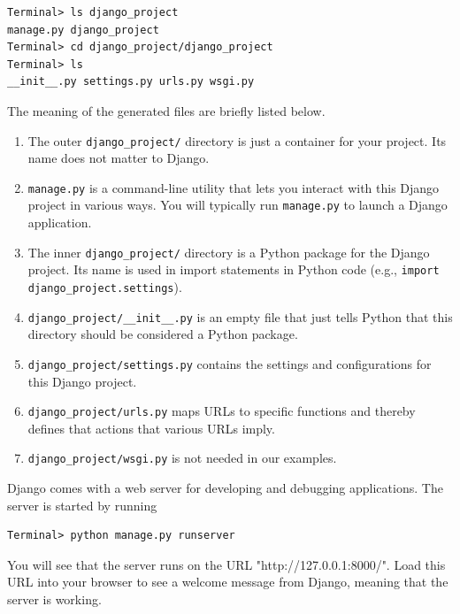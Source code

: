 \documentclass[%
oneside,                 %
final,                   %
10pt]{article}
\begin{document}
\begin{Verbatim}[numbers=none,fontsize=\fontsize{9pt}{9pt},baselinestretch=0.85]
Terminal> ls django_project
manage.py django_project
Terminal> cd django_project/django_project
Terminal> ls
__init__.py settings.py urls.py wsgi.py
\end{Verbatim}
The meaning of the generated files are briefly listed below.

\begin{enumerate}
  \item The outer \Verb!django_project/! directory is just a container for your project. Its name does not matter to Django.

  \item \Verb!manage.py! is a command-line utility that lets you interact with this Django project in various ways. You will typically run \Verb!manage.py! to launch a Django application.

  \item The inner \Verb!django_project/! directory is a Python package for the Django project. Its name is used in import statements in Python code (e.g., \Verb!import django_project.settings!).

  \item \Verb!django_project/__init__.py! is an empty file that just tells Python that this directory should be considered a Python package.

  \item \Verb!django_project/settings.py! contains the settings and configurations for this Django project.

  \item \Verb!django_project/urls.py! maps URLs to specific functions and thereby defines that actions that various URLs imply.

  \item \Verb!django_project/wsgi.py! is not needed in our examples.
\end{enumerate}

\noindent
Django comes with a web server for developing and debugging applications.
The server is started by running

\begin{Verbatim}[numbers=none,fontsize=\fontsize{9pt}{9pt},baselinestretch=0.85]
Terminal> python manage.py runserver
\end{Verbatim}
You will see that the server runs on the URL "http://127.0.0.1:8000/".
Load this URL into your browser to see a welcome message from Django,
meaning that the server is working.
\end{document}
